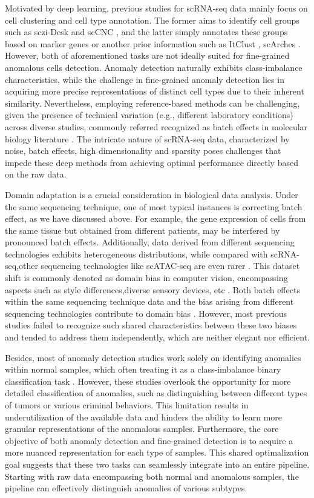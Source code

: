 \documentclass{article}
\begin{document}
Motivated by deep learning, previous studies for scRNA-seq data mainly focus on cell 
clustering and cell type annotation. The former aims to identify cell groups such as sczi-Desk \cite{sczi-Desk} 
and scCNC \cite{scCNC}, and the latter simply annotates these groups based on marker genes or another prior 
information such as ItClust \cite{ItClust}, scArches \cite{scArches}. 
However, both of aforementioned tasks are not ideally suited for fine-grained anomalous cells detection. 
Anomaly detection naturally exhibits class-imbalance characteristics, while the challenge 
in fine-grained anomaly detection lies in acquiring more precise representations of distinct cell types 
due to their inherent similarity. Nevertheless, employing reference-based methods can be challenging, given the presence of 
technical variation (e.g., different laboratory conditions) across diverse studies, 
commonly referred recognized as batch effects in molecular biology literature \cite{Polyphony}. 
The intricate nature of scRNA-seq data, characterized by noise, batch effects, high 
dimensionality and sparsity \cite{dands} poses challenges that impede these deep 
methods from achieving optimal performance directly based on the raw data.

Domain adaptation is a crucial consideration in biological data analysis. Under the same sequencing technique, one of most 
typical instances is correcting batch effect, as we have discussed above. For example, the gene expression of cells from 
the same tissue but obtained from different patients, may be interfered by pronounced batch effects. 
Additionally, data derived from different sequencing technologies exhibits heterogeneous distributions, while 
compared with scRNA-seq,other sequencing technologies like scATAC-seq are even rarer \cite{RNAmore}.
This dataset shift is commonly denoted as domain bias in computer vision, encompassing aspects 
such as style differences,diverse sensory devices, etc \cite{domainada}. Both batch effects within the same sequencing technique data and the bias arising from different 
sequencing technologies contribute to domain bias \cite{ACE}. However, most previous studies failed to 
recognize such shared characteristics between these two biases and tended to address them 
independently, which are neither elegant nor efficient.

Besides, most of anomaly detection studies work solely on identifying anomalies within normal 
samples, which often treating it as a class-imbalance binary classification task \cite{OA}. 
However, these studies overlook the opportunity for more detailed classification of 
anomalies, such as distinguishing between different types of tumors or various criminal 
behaviors. This limitation results in underutilization of the available data and hinders 
the ability to learn more granular representations of the anomalous samples. 
Furthermore, the core objective of both anomaly detection and fine-grained detection is to 
acquire a more nuanced representation for each type of samples. This shared optimalization 
goal suggests that these two tasks can seamlessly integrate into an entire pipeline. 
Starting with raw data encompassing both normal and anomalous samples, the pipeline can 
effectively distinguish anomalies of various subtypes.
\end{document}
